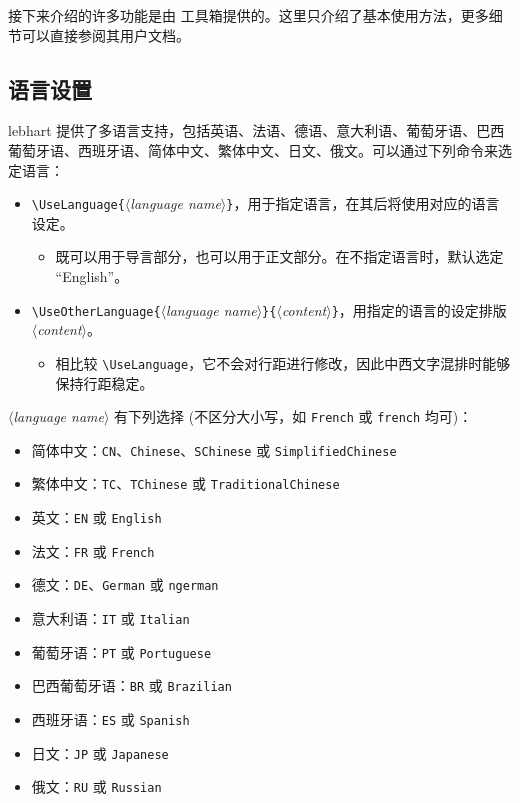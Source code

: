 \documentclass[Chinese,English,French,allowbf,puretext]{lebhart}
\theoremstyle{basic}
\theoremstyle{emphasis}
\theoremstyle{simple}
\providecommand{\meta}[1]{$\langle${\normalfont\itshape#1}$\rangle$}
\providecommand{\lebhart}{{\normalfont\textsf{lebhart}}}
\begin{document}
接下来介绍的许多功能是由 \ProjLib{} 工具箱提供的。这里只介绍了基本使用方法，更多细节可以直接参阅其用户文档。

\medskip
\subsection{语言设置}

\lebhart{} 提供了多语言支持，包括英语、法语、德语、意大利语、葡萄牙语、巴西葡萄牙语、西班牙语、简体中文、繁体中文、日文、俄文。可以通过下列命令来选定语言：
\begin{itemize}
    \item \lstinline|\UseLanguage{|\meta{language name}\lstinline|}|，用于指定语言，在其后将使用对应的语言设定。
    \begin{itemize}
        \item 既可以用于导言部分，也可以用于正文部分。在不指定语言时，默认选定 “English”。
    \end{itemize}
    \item \lstinline|\UseOtherLanguage{|\meta{language name}\lstinline|}{|\meta{content}\lstinline|}|，用指定的语言的设定排版 \meta{content}。
    \begin{itemize}
        \item 相比较 \lstinline|\UseLanguage|，它不会对行距进行修改，因此中西文字混排时能够保持行距稳定。
    \end{itemize}
\end{itemize}

\meta{language name} 有下列选择 (不区分大小写，如 \texttt{French} 或 \texttt{french} 均可)：
\begin{itemize}
    \item 简体中文：\texttt{CN}、\texttt{Chinese}、\texttt{SChinese} 或 \texttt{SimplifiedChinese}
    \item 繁体中文：\texttt{TC}、\texttt{TChinese} 或 \texttt{TraditionalChinese}
    \item 英文：\texttt{EN} 或 \texttt{English}
    \item 法文：\texttt{FR} 或 \texttt{French}
    \item 德文：\texttt{DE}、\texttt{German} 或 \texttt{ngerman}
    \item 意大利语：\texttt{IT} 或 \texttt{Italian}
    \item 葡萄牙语：\texttt{PT} 或 \texttt{Portuguese}
    \item 巴西葡萄牙语：\texttt{BR} 或 \texttt{Brazilian}
    \item 西班牙语：\texttt{ES} 或 \texttt{Spanish}
    \item 日文：\texttt{JP} 或 \texttt{Japanese}
    \item 俄文：\texttt{RU} 或 \texttt{Russian}
\end{itemize}
\end{document}
